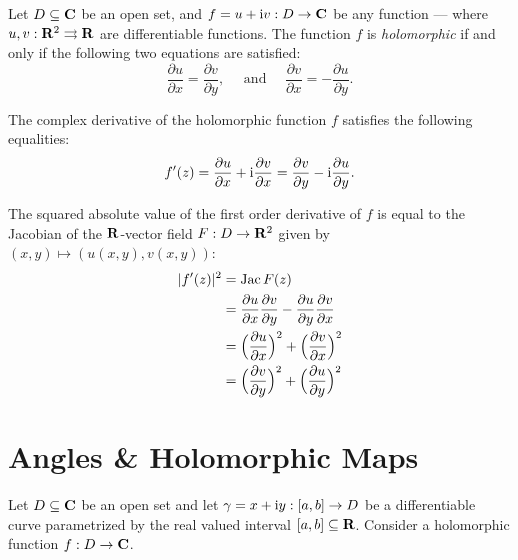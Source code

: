 \begin{theorem}
\label{thm:cauchy-riemann-complex-function}
    Let \(D \subseteq \mathbf{C}\) be an open set, and \(f = u + \text{i} v: D \to \mathbf{C}\)
    be any function --- where \(u, v: \mathbf{R}^2 \rightrightarrows \mathbf{R}\) are differentiable functions. The function
    \(f\) is \emph{holomorphic} if and only if the following two equations are satisfied:
    \[
        \frac{\partial u}{\partial x} = \frac{\partial v}{\partial y},
        \quad\text{ and }\quad
        \frac{\partial v}{\partial x} = -\frac{\partial u}{\partial y}.
    \]
\end{theorem}

\begin{corollary}
    The complex derivative of the holomorphic function \(f\) satisfies the following equalities:
    \[ 
        f'(z) = \frac{\partial u}{\partial x} + \text{i} \frac{\partial v}{\partial x}
              = \frac{\partial v}{\partial y} - \text{i} \frac{\partial u}{\partial y}.
    \]
\end{corollary}

\begin{corollary}
    The squared absolute value of the first order derivative of \(f\) is equal to the Jacobian of
    the \(\mathbf{R}\)-vector field \(F: D \to \mathbf{R}^2\) given by \((x, y) \mapsto (u(x, y), v(x, y))\):
    \begin{align*}
        |f'(z)|^2 &= \operatorname{Jac} F(z) \\
                  &= \frac{\partial u}{\partial x} \frac{\partial v}{\partial y}   
                    - \frac{\partial u}{\partial y} \frac{\partial v}{\partial x} \\
                  &= \Big( \frac{\partial u}{\partial x} \Big)^2
                    + \Big( \frac{\partial v}{\partial x} \Big)^2 \\
                  &= \Big( \frac{\partial v}{\partial y} \Big)^2
                    + \Big( \frac{\partial u}{\partial y} \Big)^2
    \end{align*}
\end{corollary}

\section{Angles \& Holomorphic Maps}

Let \(D \subseteq \mathbf{C}\) be an open set and let \(\gamma = x + \text{i} y: [a, b] \to D\) be a
differentiable curve parametrized by the real valued interval \([a, b] \subseteq \mathbf{R}\).
Consider a holomorphic function \(f: D \to \mathbf{C}\).

